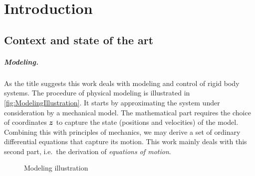 \chapter{Introduction}\label{sec:intro}

\section{Context and state of the art}

\paragraph{Modeling.}
As the title suggests this work deals with modeling and control of rigid body systems.
The procedure of physical modeling is illustrated in \autoref{fig:ModelingIllustration}.
It starts by approximating the system under consideration by a mechanical model.
The mathematical part requires the choice of coordinates $\boldsymbol{z}$ to capture the state (positions and velocities) of the model.
Combining this with principles of mechanics, we may derive a set of ordinary differential equations that capture its motion.
This work mainly deals with this second part, i.e.\ the derivation of \textit{equations of motion}.

\begin{figure}[ht]
 \centering
 \newcommand{\ModelingIllustrationOde}{$\dot{\sysState}=\tuple{f}(\sysState,\sysInput)$}
 
 \caption{Modeling illustration}
 \label{fig:ModelingIllustration}
\end{figure}

